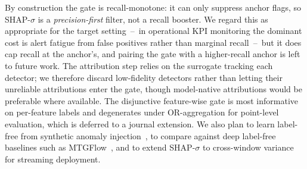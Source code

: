 \documentclass[conference]{IEEEtran}
\begin{document}
By construction the gate is recall-monotone: it can only suppress anchor
flags, so SHAP-$\sigma$ is a \emph{precision-first} filter, not a recall
booster. We regard this as appropriate for the target setting~--~in
operational KPI monitoring the dominant cost is alert fatigue from false
positives rather than marginal recall~--~but it does cap recall at the
anchor's, and pairing the gate with a higher-recall anchor is left to
future work. The attribution step relies on the surrogate tracking each
detector; we therefore discard low-fidelity detectors rather than letting
their unreliable attributions enter the gate, though model-native
attributions would be preferable where available. The disjunctive
feature-wise gate is most informative on per-feature labels and
degenerates under OR-aggregation for point-level evaluation, which is
deferred to a journal extension. We also plan to learn label-free from
synthetic anomaly injection~\cite{Goswami2023,Zhao2021}, to compare
against deep label-free baselines such as MTGFlow~\cite{zhou2023labelfree},
and to extend SHAP-$\sigma$ to cross-window variance for streaming
deployment.

\balance


\end{document}
